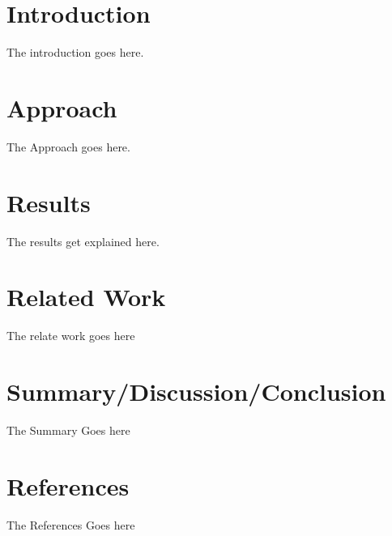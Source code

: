 \documentclass[10pt,twocolumn,letterpaper]{article}
\begin{document}
\section{Introduction}

The introduction goes here.


\section{Approach}
The Approach goes here.

\section{Results}
The results get explained here.

\section{Related Work}
The relate work goes here

\section{Summary/Discussion/Conclusion}
The Summary Goes here

\section{References}
The References Goes here
\end{document}
